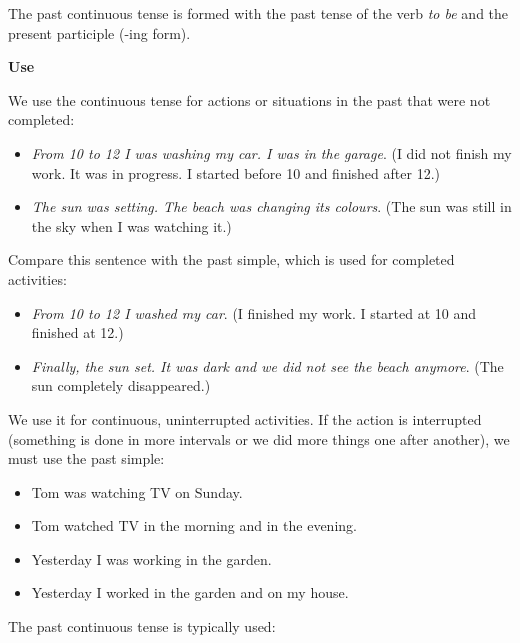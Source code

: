 The past continuous tense is formed with the past tense of the verb \textit{to be} and the present participle (-ing form).

\textbf{Use}

We use the continuous tense for actions or situations in the past that were not completed:

\begin{itemize}
\item \textit{From 10 to 12 I was washing my car. I was in the garage}. (I did not finish my work. It was in progress. I started before 10 and finished after 12.)
\item \textit{The sun was setting. The beach was changing its colours}. (The sun was still in the sky when I was watching it.)

\end{itemize}

Compare this sentence with the past simple, which is used for completed activities: 

\begin{itemize}
\item \textit{From 10 to 12 I washed my car}. (I finished my work. I started  at 10 and finished at 12.)
\item \textit{Finally, the sun set. It was dark and we did not see the beach anymore}. (The sun completely disappeared.)
\end{itemize}

We use it for continuous, uninterrupted activities. If the action is interrupted (something is done in more intervals or we did more things one after another), we must use the past simple:

\begin{itemize}
\item Tom was watching TV on Sunday.
\item Tom watched TV in the morning and in the evening.
\item Yesterday I was working in the garden.
\item Yesterday I worked in the garden and on my house.
\end{itemize}

The past continuous tense is typically used:

